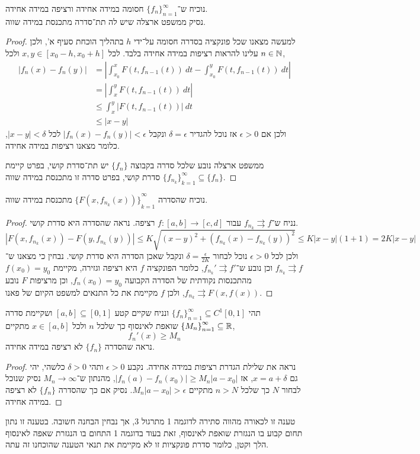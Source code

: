 \subquestion{}
נוכיח ש־${\{ f_n \}}_{n = 1}^\infty$ חסומה במידה אחידה ורציפה במידה אחידה. \\
נסיק ממשפט ארצלה שיש לה תת־סדרה מתכנסת במידה שווה.
\begin{proof}
	למעשה מצאנו שכל פונקציה בסדרה חסומה על־ידי $h$ בתהליך הוכחת סעיף א', ולכן עלינו להראות רציפות במידה אחידה בלבד.
	לכל $x, y \in [x_0 - h, x_0 + h]$ ולכל $n \in \mathbb{N}$,
	\begin{align*}
		|f_n(x) - f_n(y)|
		& = \left\lvert \int_{x_0}^x F(t, f_{n - 1}(t))\ dt - \int_{x_0}^y F(t, f_{n - 1}(t))\ dt \right\rvert \\
		& = \left\lvert \int_x^y F(t, f_{n - 1}(t))\ dt \right\rvert \\
		& \le \int_x^y |F(t, f_{n - 1}(t))|\ dt \\
		& \le |x - y|
	\end{align*}
	ולכן אם $\epsilon > 0$ אז נוכל להגדיר $\delta = \epsilon$ ונקבל $|f_n(x) - f_n(y)| < \epsilon$ לכל $|x - y| < \delta$, כלומר מצאנו רציפות במידה אחידה.

	ממשפט ארצלה נובע שלכל סדרה בקבוצה $\{ f_n \}$ יש תת־סדרת קושי, בפרט קיימת ${\{ f_{n_k} \}}_{k = 1}^\infty \subseteq \{ f_n \}$ סדרת קושי, בפרט סדרה זו מתכנסת במידה שווה.
\end{proof}

\subquestion{}
נוכיח שהסדרה ${\{ F(x, f_{n_k}(x)) \}}_{k = 1}^\infty$ מתכנסת במידה שווה.
\begin{proof}
	נניח ש־$f_{n_k} \rightrightarrows f$ עבור $f : [a, b] \to [c, d]$ רציפה.
	נראה שהסדרה היא סדרת קושי.
	\[
		|F(x, f_{n_k}(x)) - F(y, f_{n_k}(y))|
		\le K \sqrt{{(x - y)}^2 + {(f_{n_k}(x) - f_{n_k}(y))}^2}
		\le K |x - y| (1 + 1)
		= 2K |x - y|
	\]
	ולכן לכל $\epsilon > 0$ נוכל לבחור $\delta = \frac{\epsilon}{2K}$ ונקבל שאכן הסדרה היא סדרת קושי.
	נבחין כי מצאנו ש־$f_{n_k} \rightrightarrows f$ וכן נובע ש־$f_{n_k}' \rightrightarrows f'$, כלומר הפונקציה $f$ היא רציפה וגזירה, מקיימת $f(x_0) = y_0$ מהתכנסות נקודתית של הסדרה הקבועה $f_n(x_0) = y_0$,
	וכן מרציפות $F$ נובע $f_{n_k} \rightrightarrows F(x, f(x))$, ולכן $f$ מקיימת את כל התנאים למשפט הקיום של פאנו.
\end{proof}

\question{}
תהי ${\{ f_n \}}_{n = 1}^\infty \subseteq C^1[0, 1]$ ונניח שקיים קטע $[a, b] \subseteq [0, 1]$ ושקיימת סדרה ${\{ M_n \}}_{n = 1}^\infty \subseteq \mathbb{R}$ שואפת לאינסוף כך שלכל $n$ ולכל $x \in [a, b]$ מתקיים,
\[
	f_n'(x) \ge M_n
\]
נראה שהסדרה $\{ f_n \}$ לא רציפה במידה אחידה.
\begin{proof}
	נראה את שלילת הגדרת רציפות במידה אחידה.
	נקבע $\epsilon > 0$ ותהי $\delta > 0$ כלשהי, יהי גם $x = a + \delta$, אז $|f_n(a) - f_n(x_0)| \ge M_n |a - x_0|$, מהנתון ש־$M_n \to \infty$ נסיק שנוכל לבחור $N$ כך שלכל $n > N$ מתקיים $M_n |a - x_0| > \epsilon$.
	נסיק אם כך שהסדרה $\{ f_n \}$ לא רציפה במידה אחידה.
\end{proof}
טענה זו לכאורה מהווה סתירה לדוגמה 1 מתרגול 3, אך נבחין הבחנה חשובה.
בטענה זו נתון תחום קבוע בו הנגזרת שואפת לאינסוף, זאת בעוד בדוגמה 1 התחום בו הנגזרת שאפה לאינסוף הלך וקטן, כלומר סדרת פונקציות זו לא מקיימת את תנאי הטענה שהוכחנו זה עתה.

